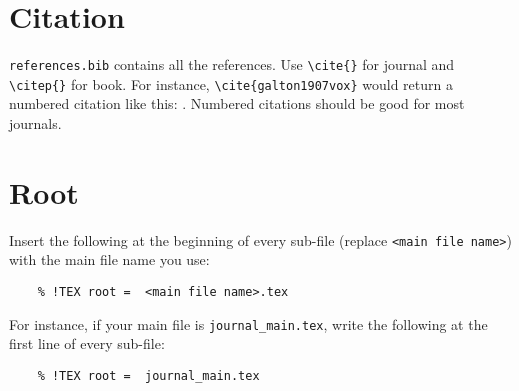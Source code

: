 \section{Citation} 
\verb|references.bib| contains all the references.
Use \verb|\cite{}| for journal 
and \verb|\citep{}| for book.
For instance, \verb|\cite{galton1907vox}|
would return a numbered citation like this: \cite{galton1907vox}.
Numbered citations should be good for most journals.

\section{Root} Insert the following at the beginning
of every sub-file (replace \verb|<main file name>|)
with the main file name you use:
\begin{verbatim}
	% !TEX root =  <main file name>.tex
\end{verbatim}
For instance, if your main file is \verb|journal_main.tex|,
write the following at the first line of every sub-file:
\begin{verbatim}
	% !TEX root =  journal_main.tex
\end{verbatim}













